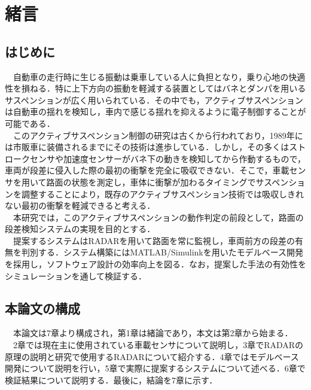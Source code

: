 \chapter{緒言}
\section{はじめに}
　自動車の走行時に生じる振動は乗車している人に負担となり，乗り心地の快適性を損ねる．特に上下方向の振動を軽減する装置としてはバネとダンパを用いるサスペンションが広く用いられている．その中でも，アクティブサスペンションは自動車の揺れを検知し，車内で感じる揺れを抑えるように電子制御することが可能である．\\
　このアクティブサスペンション制御の研究は古くから行われており，1989年には市販車に装備されるまでにその技術は進歩している\cite{active_suspension}．しかし，その多くはストロークセンサや加速度センサーがバネ下の動きを検知してから作動するもので，車両が段差に侵入した際の最初の衝撃を完全に吸収できない．そこで，車載センサを用いて路面の状態を測定し，車体に衝撃が加わるタイミングでサスペンションを調整することにより，既存のアクティブサスペンション技術では吸収しきれない最初の衝撃を軽減できると考える．\\
　本研究では，このアクティブサスペンションの動作判定の前段として，路面の段差検知システムの実現を目的とする．\\
　提案するシステムはRADARを用いて路面を常に監視し，車両前方の段差の有無を判別する．システム構築にはMATLAB/Simulinkを用いたモデルベース開発を採用し，ソフトウェア設計の効率向上を図る．なお，提案した手法の有効性をシミュレーションを通して検証する．

\section{本論文の構成}
　本論文は7章より構成され，第1章は緒論であり，本文は第2章から始まる．\\
　2章では現在主に使用されている車載センサについて説明し，3章でRADARの原理の説明と研究で使用するRADARについて紹介する．4章ではモデルベース開発について説明を行い，5章で実際に提案するシステムについて述べる．6章で検証結果について説明する．最後に，結論を7章に示す．\\
